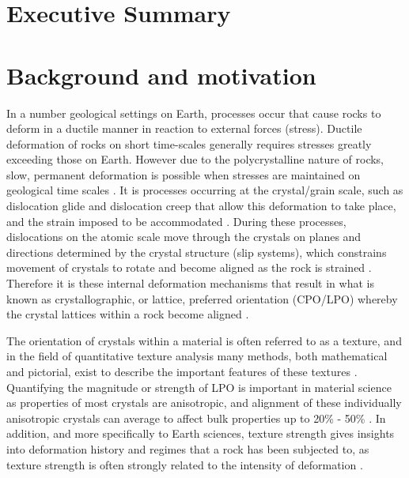 \documentclass[a4paper,12pt,twoside]{report}
\numberwithin{equation}{chapter}
\begin{document}
\section{Executive Summary} \label{sec:summary}

\section{Background and motivation} \label{sec:background}
In a number geological settings on Earth, processes occur that cause rocks to deform in a ductile manner in reaction to external forces (stress). Ductile deformation of rocks on short time-scales generally requires stresses greatly exceeding those on Earth. However due to the polycrystalline nature of rocks, slow, permanent deformation is possible when stresses are maintained on geological time scales \citep{Weiss1985}. It is processes occurring at the crystal/grain scale, such as dislocation glide and dislocation creep that allow this deformation to take place, and the strain imposed to be accommodated \citep{Ashby1972}. During these processes, dislocations on the atomic scale move through the crystals on planes and directions determined by the crystal structure (slip systems), which constrains movement of crystals to rotate and become aligned as the rock is strained \citep{Goulding2015}. Therefore it is these internal deformation mechanisms that result in what is known as crystallographic, or lattice, preferred orientation (CPO/LPO) whereby the crystal lattices within a rock become aligned \citep{Price1985}.   

The orientation of crystals within a material is often referred to as a texture, and in the field of quantitative texture analysis many methods, both mathematical and pictorial, exist to describe the important features of these textures \citep[for introductory texts see][]{bunge1982texture,Bunge1985,Randle2000,Mainprice}. Quantifying the magnitude or strength of LPO is important in material science as properties of most crystals are anisotropic, and alignment of these individually anisotropic crystals can average to affect bulk properties up to 20\% - 50\% \citep{Randle2000}. In addition, and more specifically to Earth sciences, texture strength gives insights into deformation history and regimes that a rock has been subjected to, as texture strength is often strongly related to the intensity of deformation \citep{Weiss1985}.
\end{document}
